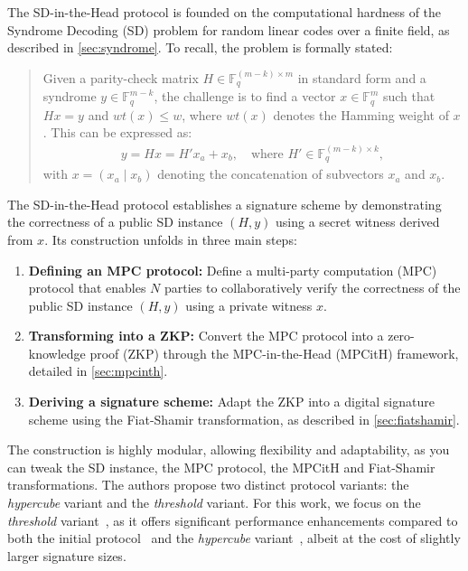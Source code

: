 \documentclass[11pt]{report}
\theoremstyle{definition}
\theoremstyle{plain}
\begin{document}
The SD-in-the-Head protocol is founded on the computational hardness of the Syndrome Decoding (SD) problem for random linear codes over a finite field, as described in \autoref{sec:syndrome}. To recall, the problem is formally stated:
\begin{quote}
  Given a parity-check matrix $H \in \mathbb{F}_q^{(m-k) \times m}$ in standard form and a syndrome $y \in \mathbb{F}_q^{m-k}$, the challenge is to find a vector $x \in \mathbb{F}_q^m$ such that $Hx = y$ and $wt(x) \leq w$, where $wt(x)$ denotes the Hamming weight of $x$. This can be expressed as:
  \begin{align*}
    y = Hx = H'x_a + x_b, \quad \text{where } H' \in \mathbb{F}_q^{(m-k) \times k},
  \end{align*}
  with $x = (x_a \mid x_b)$ denoting the concatenation of subvectors $x_a$ and $x_b$.
\end{quote}

The SD-in-the-Head protocol establishes a signature scheme by demonstrating the correctness of a public SD instance $(H, y)$ using a secret witness derived from $x$. Its construction unfolds in three main steps:
\begin{enumerate}
  \item \textbf{Defining an MPC protocol:} Define a multi-party computation (MPC) protocol that enables $N$ parties to collaboratively verify the correctness of the public SD instance $(H, y)$ using a private witness $x$.
  \item \textbf{Transforming into a ZKP:} Convert the MPC protocol into a zero-knowledge proof (ZKP) through the MPC-in-the-Head (MPCitH) framework, detailed in \autoref{sec:mpcinth}.
  \item \textbf{Deriving a signature scheme:} Adapt the ZKP into a digital signature scheme using the Fiat-Shamir transformation, as described in \autoref{sec:fiatshamir}.
\end{enumerate}

The construction is highly modular, allowing flexibility and adaptability, as you can tweak the SD instance, the MPC protocol, the MPCitH and Fiat-Shamir transformations. The authors propose two distinct protocol variants: the \textit{hypercube} variant and the \textit{threshold} variant. For this work, we focus on the \textit{threshold} variant~\cite{aguilarsyndrome11,feneuil2023threshold,feneuil2023threshold2}, as it offers significant performance enhancements compared to both the initial protocol~\cite{feneuil2022syndrome} and the \textit{hypercube} variant~\cite{aguilarsyndrome11,aguilar2023return,feneuil2023threshold2}, albeit at the cost of slightly larger signature sizes.
\end{document}
